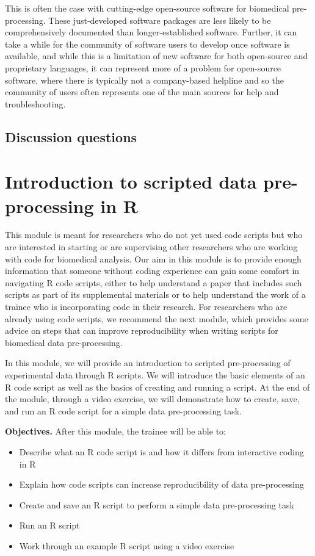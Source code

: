 \documentclass[]{tufte-book}
\providecommand{\tightlist}{%
  \setlength{\itemsep}{0pt}\setlength{\parskip}{0pt}}
\begin{document}
This is often the case with cutting-edge open-source software for biomedical
pre-processing. These just-developed software packages are less likely to be
comprehensively documented than longer-established software. Further, it can
take a while for the community of software users to develop once software is
available, and while this is a limitation of new software for both open-source
and proprietary languages, it can represent more of a problem for open-source
software, where there is typically not a company-based helpline and so the
community of users often represents one of the main sources for help and
troubleshooting.

\subsection{Discussion questions}\label{discussion-questions-3}

\section{Introduction to scripted data pre-processing in R}\label{module13}

This module is meant for researchers who do not yet used code scripts but who
are interested in starting or are supervising other researchers who are working
with code for biomedical analysis. Our aim in this module is to provide enough
information that someone without coding experience can gain some comfort in
navigating R code scripts, either to help understand a paper that includes such
scripts as part of its supplemental materials or to help understand the work of
a trainee who is incorporating code in their research. For researchers who are
already using code scripts, we recommend the next module, which provides some
advice on steps that can improve reproducibility when writing scripts for
biomedical data pre-processing.

In this module, we will provide an introduction to scripted pre-processing of
experimental data through R scripts. We will introduce the basic elements of an
R code script as well as the basics of creating and running a script. At the end
of the module, through a video exercise, we will demonstrate how to create,
save, and run an R code script for a simple data pre-processing task.

\textbf{Objectives.} After this module, the trainee will be able to:

\begin{itemize}
\tightlist
\item
  Describe what an R code script is and how it differs from interactive
  coding in R
\item
  Explain how code scripts can increase reproducibility of data pre-processing
\item
  Create and save an R script to perform a simple data pre-processing task
\item
  Run an R script
\item
  Work through an example R script using a video exercise
\end{itemize}
\end{document}
